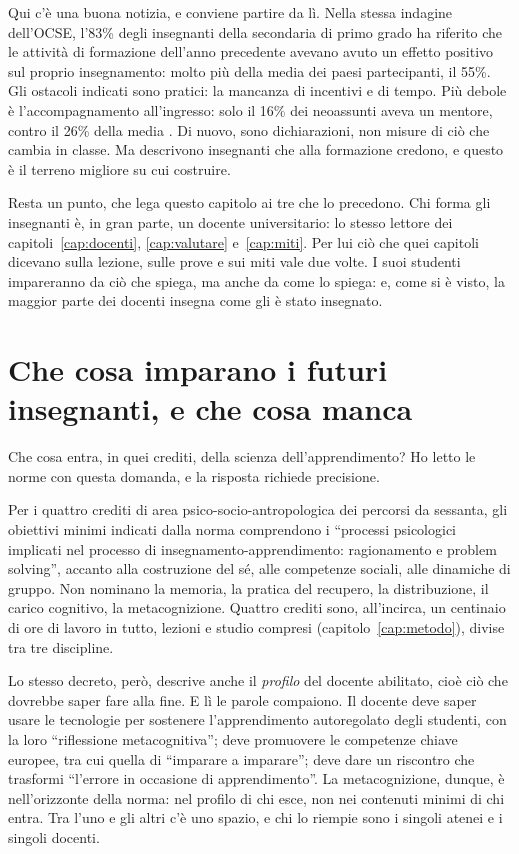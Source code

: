Qui c'è una buona notizia, e conviene partire da lì. Nella stessa
indagine dell'OCSE, l'83\% degli insegnanti della secondaria di primo
grado ha riferito che le attività di formazione dell'anno precedente
avevano avuto un effetto positivo sul proprio insegnamento: molto più
della media dei paesi partecipanti, il 55\%. Gli ostacoli indicati
sono pratici: la mancanza di incentivi e di tempo. Più debole è
l'accompagnamento all'ingresso: solo il 16\% dei neoassunti aveva un
mentore, contro il 26\% della media \parencite{oecd2025talis}. Di
nuovo, sono dichiarazioni, non misure di ciò che cambia in classe. Ma
descrivono insegnanti che alla formazione credono, e questo è il
terreno migliore su cui costruire.

Resta un punto, che lega questo capitolo ai tre che lo precedono. Chi
forma gli insegnanti è, in gran parte, un docente universitario: lo
stesso lettore dei capitoli~\ref{cap:docenti}, \ref{cap:valutare}
e~\ref{cap:miti}. Per lui ciò che quei capitoli dicevano sulla lezione,
sulle prove e sui miti vale due volte. I suoi studenti impareranno da
ciò che spiega, ma anche da come lo spiega: e, come si è visto, la
maggior parte dei docenti insegna come gli è stato insegnato.

\section{Che cosa imparano i futuri insegnanti, e che cosa manca}

Che cosa entra, in quei crediti, della scienza dell'apprendimento? Ho
letto le norme con questa domanda, e la risposta richiede precisione.

Per i quattro crediti di area psico-socio-antropologica dei percorsi
da sessanta, gli obiettivi minimi indicati dalla norma comprendono i
\enquote{processi psicologici implicati nel processo di
insegnamento-apprendimento: ragionamento e problem solving}, accanto
alla costruzione del sé, alle competenze sociali, alle dinamiche di
gruppo. Non nominano la memoria, la pratica del recupero, la
distribuzione, il carico cognitivo, la metacognizione. Quattro crediti
sono, all'incirca, un centinaio di ore di lavoro in tutto, lezioni e
studio compresi (capitolo~\ref{cap:metodo}), divise tra tre
discipline.

Lo stesso decreto, però, descrive anche il \emph{profilo} del docente
abilitato, cioè ciò che dovrebbe saper fare alla fine. E lì le parole
compaiono. Il docente deve saper usare le tecnologie per sostenere
l'apprendimento autoregolato degli studenti, con la loro
\enquote{riflessione metacognitiva}; deve promuovere le competenze
chiave europee, tra cui quella di \enquote{imparare a imparare}; deve
dare un riscontro che trasformi \enquote{l'errore in occasione di
apprendimento}. La metacognizione, dunque, è nell'orizzonte della
norma: nel profilo di chi esce, non nei contenuti minimi di chi entra.
Tra l'uno e gli altri c'è uno spazio, e chi lo riempie sono i singoli
atenei e i singoli docenti.

